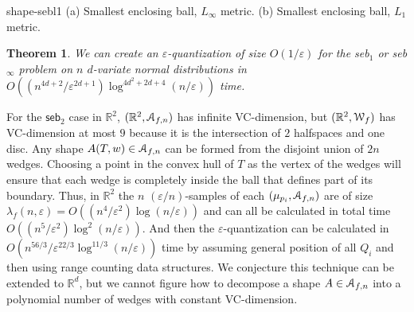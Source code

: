 \documentclass{journal}
\newcommand{\eps}{\varepsilon}
\newcommand{\Eu}[1]{\ensuremath{\EuScript{#1}}}
\newcommand{\R}{\ensuremath{\mathbb{R}}}
\newtheorem {theorem}{Theorem}[section]
\begin{document}
 {shape-sebl1}
{(a) Smallest enclosing ball, $L_\infty$ metric. (b) Smallest enclosing ball, $L_1$ metric.}

\begin{theorem}
We can create an $\eps$-quantization of size $O(1/\eps)$ for the \textsf{seb$_1$} or \textsf{seb$_\infty$} problem on $n$ $d$-variate normal distributions in $O((n^{4d+2}/\eps^{2d+1}) \log^{4d^2 + 2d + 4} (n/\eps))$ time.
\end{theorem}


For the $\textsf{seb}_2$ case in $\R^2$,
$(\R^2, \Eu{A}_{f,n})$ has infinite VC-dimension, but $(\R^2, \Eu{W}_{f})$ has VC-dimension at most $9$ because it is the intersection of $2$ halfspaces and one disc.
Any shape $A(T,w) \in \Eu{A}_{f,n}$ can be formed from the disjoint union of $2n$ wedges.  Choosing a point in the convex hull of $T$ as the vertex of the wedges will ensure that each wedge is completely inside the ball that defines part of its boundary.  Thus, in $\R^2$ the $n$ $(\eps/n)$-samples of each $(\mu_{p_i}, \Eu{A}_{f,n})$ are of size $\lambda_f(n,\eps) = O((n^4/\eps^2) \log (n/\eps))$ and can all be calculated in total time $O((n^{5}/\eps^{2}) \log^2 (n/\eps))$.  And then
the $\eps$-quantization can be calculated in $O(n^{56/3}/\eps^{22/3} \log^{11/3} (n/\eps))$ time by assuming general position of all $Q_i$ and then using range counting data structures.
We conjecture this technique can be extended to $\R^d$, but we cannot figure how to decompose a shape $A \in \Eu{A}_{f,n}$ into a polynomial number of wedges with constant VC-dimension.
\end{document}
